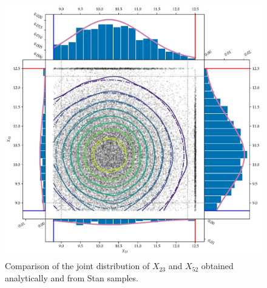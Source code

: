 \documentclass[letter]{article}
\makeatletter
\def\maxwidth{\ifdim\Gin@nat@width>\linewidth\linewidth
\else\Gin@nat@width\fi}
\let\Oldincludegraphics\includegraphics
\renewcommand{\includegraphics}[1]{\Oldincludegraphics[width=0.98\maxwidth]{#1}}
\makeatother
\begin{document}
        \begin{figure}
\centering
\includegraphics{../figures/toy_joint.pdf}
\caption{\label{fig:toy_joint}
Comparison of the joint distribution of \(X_{23}\) and \(X_{52}\)
obtained analytically and from Stan samples.}
\end{figure}
    
\end{document}
